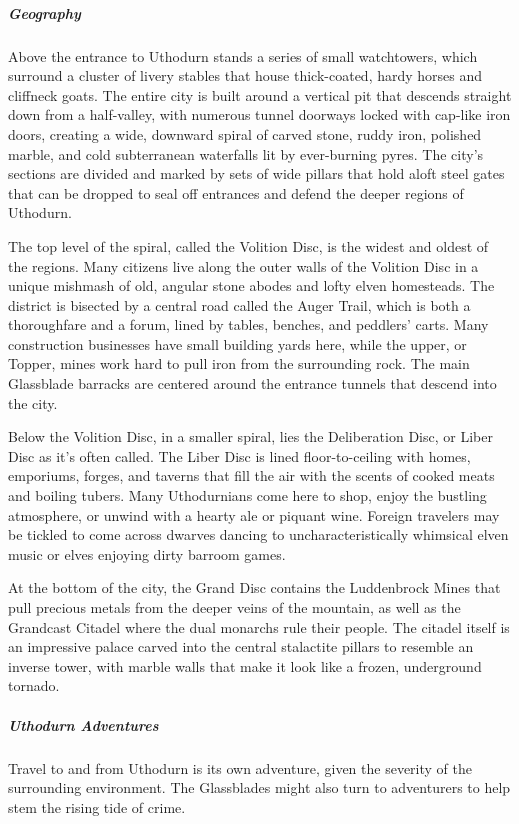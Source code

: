 \documentclass[10pt,a4paper,twoside,bg=print,twocolumn,openany,nodeprecatedcode]{dndbook}
\begin{document}
\subparagraph{Geography}
Above the entrance to Uthodurn stands a series of small watchtowers, which surround a cluster of livery stables that house thick-coated, hardy horses and cliffneck goats. The entire city is built around a vertical pit that descends straight down from a half-valley, with numerous tunnel doorways locked with cap-like iron doors, creating a wide, downward spiral of carved stone, ruddy iron, polished marble, and cold subterranean waterfalls lit by ever-burning pyres. The city's sections are divided and marked by sets of wide pillars that hold aloft steel gates that can be dropped to seal off entrances and defend the deeper regions of Uthodurn.

The top level of the spiral, called the Volition Disc, is the widest and oldest of the regions. Many citizens live along the outer walls of the Volition Disc in a unique mishmash of old, angular stone abodes and lofty elven homesteads. The district is bisected by a central road called the Auger Trail, which is both a thoroughfare and a forum, lined by tables, benches, and peddlers' carts. Many construction businesses have small building yards here, while the upper, or Topper, mines work hard to pull iron from the surrounding rock. The main Glassblade barracks are centered around the entrance tunnels that descend into the city.

Below the Volition Disc, in a smaller spiral, lies the Deliberation Disc, or Liber Disc as it's often called. The Liber Disc is lined floor-to-ceiling with homes, emporiums, forges, and taverns that fill the air with the scents of cooked meats and boiling tubers. Many Uthodurnians come here to shop, enjoy the bustling atmosphere, or unwind with a hearty ale or piquant wine. Foreign travelers may be tickled to come across dwarves dancing to uncharacteristically whimsical elven music or elves enjoying dirty barroom games.

At the bottom of the city, the Grand Disc contains the Luddenbrock Mines that pull precious metals from the deeper veins of the mountain, as well as the Grandcast Citadel where the dual monarchs rule their people. The citadel itself is an impressive palace carved into the central stalactite pillars to resemble an inverse tower, with marble walls that make it look like a frozen, underground tornado.

\subparagraph{Uthodurn Adventures}
Travel to and from Uthodurn is its own adventure, given the severity of the surrounding environment. The Glassblades might also turn to adventurers to help stem the rising tide of crime.
\end{document}
